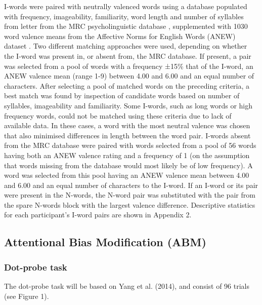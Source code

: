 \documentclass[man,floatsintext,a4paper,biblatex]{apa6}
\newcounter{Figure}
\begin{document}
I-words were paired with neutrally valenced words using a database
populated with frequency, imageability, familiarity, word length
and number of syllables from letter from the MRC psycholinguistic
database \parencite{wilson_mrc_1988}, supplemented with 1030 word
valence means from the Affective Norms for English Words (ANEW) dataset
\parencite{bradley_affective_1999}.  Two different matching approaches
were used, depending on whether the I-word was present in, or absent
from, the MRC database.  If present, a pair was selected from a pool of
words with a frequency ±15\% that of the I-word, an ANEW valence mean
(range 1-9) between 4.00 and 6.00 and an equal number of characters.
After selecting a pool of matched words on the preceding criteria, a
best match was found by inspection of candidate words based on number
of syllables, imageability and familiarity.  Some I-words, such as long
words or high frequency words, could not be matched using these criteria
due to lack of available data.  In these cases, a word with the most
neutral valence was chosen that also minimised differences in length
between the word pair.  I-words absent from the MRC database were paired
with words selected from a pool of 56 words having both an ANEW valence
rating and a frequency of 1 (on the assumption that words missing from
the database would most likely be of low frequency).  A word was selected
from this pool having an ANEW valence mean between 4.00 and 6.00 and
an equal number of characters to the I-word.  If an I-word or its pair
were present in the N-words, the N-word pair was substituted with the
pair from the spare N-words block with the largest valence difference.
Descriptive statistics for each participant's I-word pairs are shown in
Appendix 2.

\subsection{Attentional Bias Modification (ABM)}

\subsubsection{Dot-probe task}
The dot-probe task will be based on Yang et al. (2014), and consist of 96 trials (see Figure 1).
\end{document}
